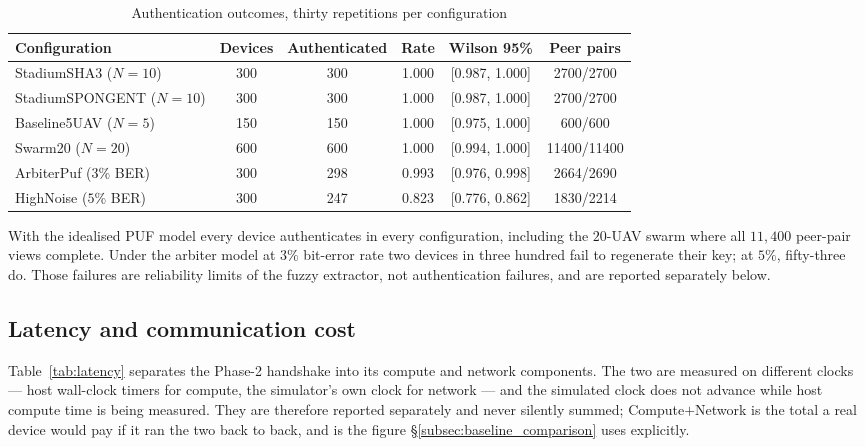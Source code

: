 \documentclass[11pt,a4paper]{article}
\begin{document}
\begin{table}[H]
\centering
\caption{Authentication outcomes, thirty repetitions per configuration}
\label{tab:functional}
\small
\begin{tabular}{@{}lccccc@{}}
\toprule
\textbf{Configuration} & \textbf{Devices} & \textbf{Authenticated} &
\textbf{Rate} & \textbf{Wilson 95\%} & \textbf{Peer pairs} \\
\midrule
StadiumSHA3 ($N{=}10$)      & 300 & 300 & 1.000 & [0.987, 1.000] & 2700/2700 \\
StadiumSPONGENT ($N{=}10$)  & 300 & 300 & 1.000 & [0.987, 1.000] & 2700/2700 \\
Baseline5UAV ($N{=}5$)      & 150 & 150 & 1.000 & [0.975, 1.000] & 600/600 \\
Swarm20 ($N{=}20$)          & 600 & 600 & 1.000 & [0.994, 1.000] & 11400/11400 \\
ArbiterPuf ($3\%$ BER)      & 300 & 298 & 0.993 & [0.976, 0.998] & 2664/2690 \\
HighNoise ($5\%$ BER)       & 300 & 247 & 0.823 & [0.776, 0.862] & 1830/2214 \\
\bottomrule
\end{tabular}
\end{table}

With the idealised PUF model every device authenticates in every configuration,
including the $20$-UAV swarm where all $11{,}400$ peer-pair views complete. Under
the arbiter model at $3\%$ bit-error rate two devices in three hundred fail to
regenerate their key; at $5\%$, fifty-three do. Those failures are reliability
limits of the fuzzy extractor, not authentication failures, and are reported
separately below.

\subsection{Latency and communication cost}
\label{subsec:latency}

Table~\ref{tab:latency} separates the Phase-2 handshake into its compute and
network components. The two are measured on different clocks --- host wall-clock
timers for compute, the simulator's own clock for network --- and the simulated
clock does not advance while host compute time is being measured. They are
therefore reported separately and never silently summed; Compute$+$Network is the
total a real device would pay if it ran the two back to back, and is the figure
\S\ref{subsec:baseline_comparison} uses explicitly.
\end{document}
